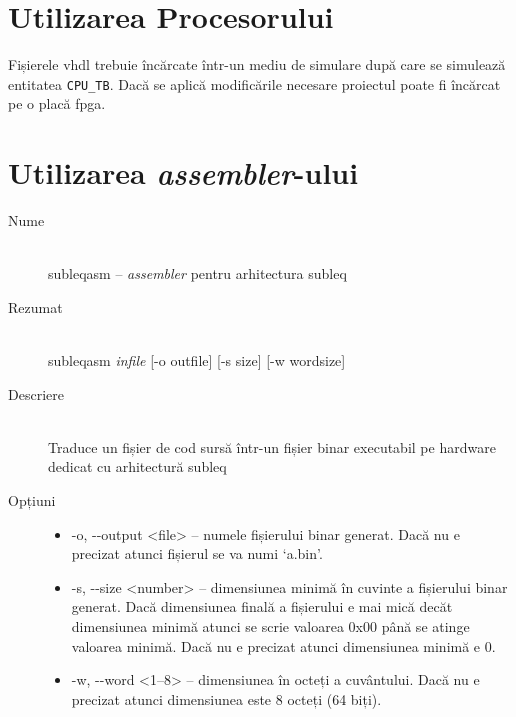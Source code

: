 \documentclass[../main.tex]{subfiles}
\begin{document}
    \section{Utilizarea Procesorului}
    Fișierele \acrshort{vhdl} trebuie încărcate într-un mediu de simulare după care se simulează
    entitatea \texttt{CPU\_TB}. Dacă se aplică modificările necesare proiectul poate fi încărcat
    pe o placă \acrshort{fpga}. \\

    \section{Utilizarea \emph{assembler}-ului}
    \begin{description}
        \item[Nume] \hfill \\
        subleqasm -- \emph{assembler} pentru arhitectura \acrshort{subleq}
        \item[Rezumat] \hfill \\
        subleqasm \emph{infile} [-o outfile] [-s size] [-w wordsize]
        \item[Descriere] \hfill \\
        Traduce un fișier de cod sursă într-un fișier binar executabil pe hardware dedicat cu 
        arhitectură \acrshort{subleq}
        \item[Opțiuni] \hfill
        \begin{itemize}
            \item -o, -{}-output <file> -- numele fișierului binar generat. Dacă nu e precizat atunci fișierul
            se va numi `a.bin'.
            \item -s, -{}-size <number> -- dimensiunea minimă în cuvinte a fișierului binar generat. Dacă
            dimensiunea finală a fișierului e mai mică decăt dimensiunea minimă atunci se scrie valoarea
            0x00 până se atinge valoarea minimă. Dacă nu e precizat atunci dimensiunea minimă e 0.
            \item -w, -{}-word <1--8> -- dimensiunea în octeți a cuvântului. Dacă nu e precizat atunci
            dimensiunea este 8 octeți (64 biți).
        \end{itemize}
    \end{description}
\end{document}
